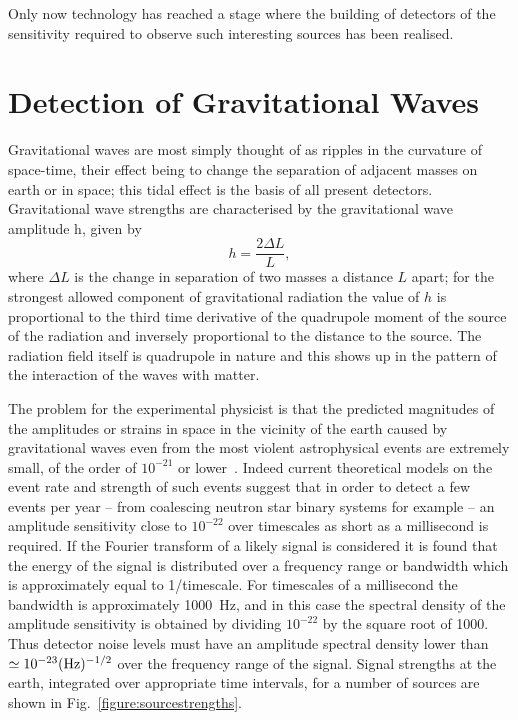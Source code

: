 \documentclass{article}
\begin{document}
Only now technology has reached a stage where the building of detectors of the
sensitivity required to observe such interesting sources has been realised.




\newpage

\section{Detection of Gravitational Waves}
\label{section:Detection}

Gravitational waves are most simply thought of as ripples in the curvature of
space-time, their effect being to change the separation of adjacent masses on
earth or in space; this tidal effect is the basis of all present detectors.
Gravitational wave strengths are characterised by the gravitational wave
amplitude h, given by
%
\begin{equation}
  h = \frac{2 \Delta L} L,
  \label{equation:h}
\end{equation}
%
where $\Delta L$ is the change in separation of two masses a distance $L$ apart;
for the strongest allowed component of gravitational radiation the value of $h$
is proportional to the third time derivative of the quadrupole moment of the
source of the radiation and inversely proportional to the distance to the
source. The radiation field itself is quadrupole in nature and this shows up in
the pattern of the interaction of the waves with matter.

The problem for the experimental physicist is that the predicted magnitudes of
the amplitudes or strains in space in the vicinity of the earth caused by
gravitational waves even from the most violent astrophysical events are
extremely small, of the order of $10^{-21}$ or lower~\cite{LISAsymposium}.
Indeed current theoretical models on the event rate and strength of such events
suggest that in order to detect a few events per year -- from coalescing neutron
star binary systems for example -- an amplitude sensitivity close to $10^{-22}$
over timescales as short as a millisecond is required. If the Fourier transform
of a likely signal is considered it is found that the energy of the signal is
distributed over a frequency range or bandwidth which is approximately equal to
1/timescale.  For timescales of a millisecond the bandwidth is approximately
1000~Hz, and in this case the spectral density of the amplitude sensitivity is
obtained by dividing $10^{-22}$ by the square root of 1000. Thus detector noise
levels must have an amplitude spectral density lower than $\simeq 10^{-23}(\rm
Hz)^{-1/2}$ over the frequency range of the signal. Signal strengths at the
earth, integrated over appropriate time intervals, for a number of sources are
shown in Fig.~\ref{figure:sourcestrengths}.
\end{document}

